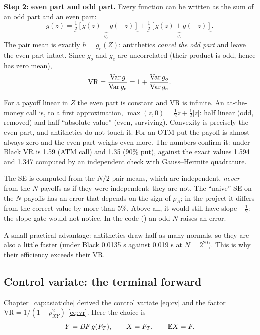 \textbf{Step 2: even part and odd part.} Every function can be written as the sum of an odd part and an even part:
\[
g(z)=\underbrace{\tfrac12[g(z)-g(-z)]}_{g_o}+\underbrace{\tfrac12[g(z)+g(-z)]}_{g_e}.
\]
The pair mean is exactly $h=g_e(Z)$: antithetics \emph{cancel the odd part} and leave the even part intact. Since
$g_o$ and $g_e$ are uncorrelated (their product is odd, hence has zero mean),
\[
\mathrm{VR}=\frac{\operatorname{Var} g}{\operatorname{Var} g_e}=1+\frac{\operatorname{Var} g_o}{\operatorname{Var} g_e}.
\]

\begin{perche}[title={Why antithetics help little on convex payoffs}]
For a payoff linear in $Z$ the even part is constant and VR is infinite. An at-the-money call is, to a first
approximation, $\max(z,0)=\tfrac12z+\tfrac12|z|$: half linear (odd, removed) and half ``absolute value'' (even,
surviving). Convexity is precisely the even part, and antithetics do not touch it. For an OTM put the payoff is almost
always zero and the even part weighs even more. The numbers confirm it: under Black VR is 1.59 (ATM call) and 1.35
(90\% put), against the exact values 1.594 and 1.347 computed by an independent check with Gauss--Hermite quadrature.
\end{perche}

\begin{attenzione}[title={Honest counting of the pairs}]
The SE is computed from the $N/2$ pair means, which are independent, \emph{never} from the $N$ payoffs as if they were
independent: they are not. The ``naive'' SE on the $N$ payoffs has an error that depends on the sign of $\rho_A$; in
the project it differs from the correct value by more than 5\%. Above all, it would still have slope $-\tfrac12$: the
slope gate would not notice. In the code () an odd $N$ raises an error.
\end{attenzione}

A small practical advantage: antithetics draw half as many normals, so they are also a little faster (under Black
0.0135 s against 0.019 s at $N=2^{20}$). This is why their efficiency exceeds their VR.

\subsection{Control variate: the terminal forward}
Chapter~\ref{cap:asiatiche} derived the control variate \eqref{eq:cv} and the factor $\mathrm{VR}=1/(1-\rho_{XY}^2)$
\eqref{eq:vr}. Here the choice is
\[
Y=\mathit{DF}\,g(F_T),\qquad X=F_T,\qquad\mathbb{E} X=F .
\]

